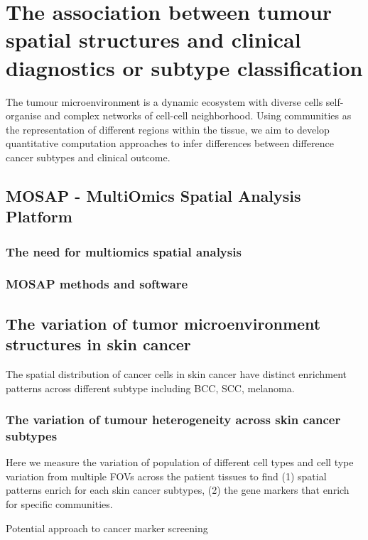 \chapter[The association between tumour spatial structure and clinical diagnostics]{The association between tumour spatial structures and clinical diagnostics or subtype classification}
\label{Chap:4}	%
\pagestyle{headings}
\label{Sec:4.1_intro}	%
The tumour microenvironment is a dynamic ecosystem with diverse cells self-organise and complex networks of cell-cell neighborhood. Using communities as the representation of different regions within the tissue, we aim to develop quantitative computation approaches to infer differences between difference cancer subtypes and clinical outcome.     


\section{MOSAP - MultiOmics Spatial Analysis Platform}

\subsection{The need for multiomics spatial analysis}


\subsection{MOSAP methods and software}


\section{The variation of tumor microenvironment structures in skin cancer}
The spatial distribution of cancer cells in skin cancer have distinct enrichment patterns across different subtype including BCC, SCC, melanoma. 

\subsection{The variation of tumour heterogeneity across skin cancer subtypes}
Here we measure the variation of population of different cell types and cell type variation from multiple FOVs across the patient tissues to find (1) spatial patterns enrich for each skin cancer subtypes, (2) the gene markers that enrich for specific communities. 

Potential approach to cancer marker screening 
